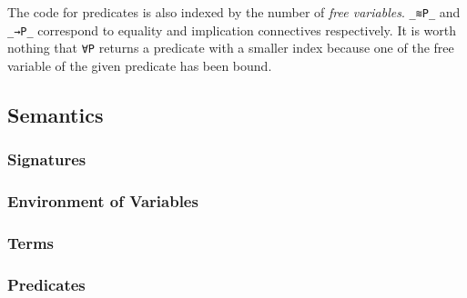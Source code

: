 \documentclass[\main/thesis.tex]{subfiles}
\begin{document}
The code for predicates is also indexed by the number of \textit{free variables}.
\lstinline|_≋P_| and \lstinline|_→P_| correspond to equality and  implication
connectives respectively.
It is worth nothing that \lstinline|∀P| returns a predicate with a smaller index
because one of the free variable of the given predicate has been bound.

\subsection{Semantics}


\subsubsection{Signatures}
\subsubsection{Environment of Variables}
\subsubsection{Terms}
\subsubsection{Predicates}


%










\end{document}
